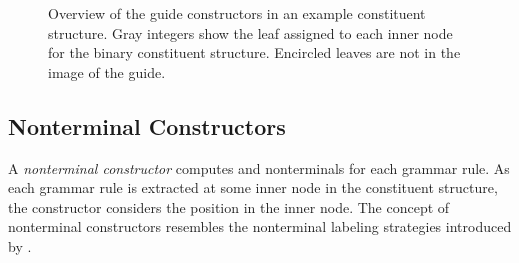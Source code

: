 \documentclass[../../document.tex]{subfiles}
\begin{document}
    \begin{figure}
        \begin{minipage}{.27\textwidth}
            \resizebox{\textwidth}{!}{}
        \end{minipage}\hfill
        \begin{minipage}{.27\textwidth}
            \resizebox{\textwidth}{!}{}
        \end{minipage}\hfill
        \begin{minipage}{.27\textwidth}
            \resizebox{\textwidth}{!}{}
        \end{minipage}

        \vspace{.5cm}

        \begin{minipage}[b]{.27\textwidth}
            \resizebox{\textwidth}{!}{}
        \end{minipage}\hfill
        \begin{minipage}[b]{.27\textwidth}
            \resizebox{\textwidth}{!}{}
        \end{minipage}\hfill
        \begin{minipage}[b]{.27\textwidth}
            \resizebox{\textwidth}{!}{}
        \end{minipage}

        \caption{\label{fig:guides}
            Overview of the guide constructors in an example constituent structure.
            Gray integers show the leaf assigned to each inner node for the binary constituent structure.
            Encircled leaves are not in the image of the guide.}
    \end{figure}

    \subsection{Nonterminal Constructors}\label{sec:ntconstructors}
    A \emph{nonterminal constructor} computes  and  nonterminals for each grammar rule.
    As each grammar rule is extracted at some inner node in the constituent structure, the constructor considers the position in the inner node.
    The concept of nonterminal constructors resembles the nonterminal labeling strategies introduced by \citet[Sec.~6.2]{Geb20}.
\end{document}
